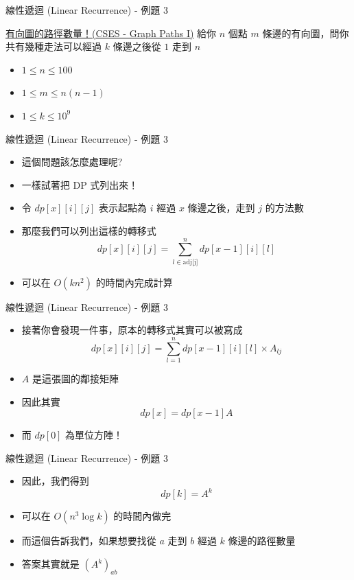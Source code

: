 \documentclass[aspectratio=169]{beamer}
\begin{document}
    \begin{frame}{線性遞迴 (Linear Recurrence) - 例題 3}
        \begin{block}{\href{https://cses.fi/problemset/task/1723}{有向圖的路徑數量！(CSES - Graph Paths I)}}
        給你 $n$ 個點 $m$ 條邊的有向圖，問你共有幾種走法可以經過 $k$ 條邊之後從 $1$ 走到 $n$ \\
        \begin{itemize}
            \item $1 \le n \le 100$
            \item $1 \le m \le n(n-1)$
            \item $1 \le k \le 10^9$
        \end{itemize}
        \end{block}
    \end{frame}
    
    \begin{frame}{線性遞迴 (Linear Recurrence) - 例題 3}
        \begin{itemize}
            \item 這個問題該怎麼處理呢?
            \item 一樣試著把 DP 式列出來！
            \item<2-> 令 $dp[x][i][j]$ 表示起點為 $i$ 經過 $x$ 條邊之後，走到 $j$ 的方法數
            \item<2-> 那麼我們可以列出這樣的轉移式 
            $$dp[x][i][j] = \sum_{l \in \text{adj[j]}}^n dp[x-1][i][l]$$
            \item<3-> 可以在 $O(kn^2)$ 的時間內完成計算
        \end{itemize}
    \end{frame}
    
    \begin{frame}{線性遞迴 (Linear Recurrence) - 例題 3}
        \begin{itemize}
            \item 接著你會發現一件事，原本的轉移式其實可以被寫成
            $$dp[x][i][j] = \sum_{l=1}^n dp[x-1][i][l] \times A_{lj}$$
            \item $A$ 是這張圖的鄰接矩陣
            \item 因此其實
            $$dp[x] = dp[x-1]A$$
            \item 而 $dp[0]$ 為單位方陣！
        \end{itemize}
    \end{frame}
    
    \begin{frame}{線性遞迴 (Linear Recurrence) - 例題 3}
        \begin{itemize}
            \item 因此，我們得到
            $$dp[k] = A^k$$
            \item 可以在 $O(n^3 \log k)$ 的時間內做完
            \item 而這個告訴我們，如果想要找從 $a$ 走到 $b$ 經過 $k$ 條邊的路徑數量
            \item 答案其實就是 $(A^k)_{ab}$
        \end{itemize}
    \end{frame}
    
\end{document}
